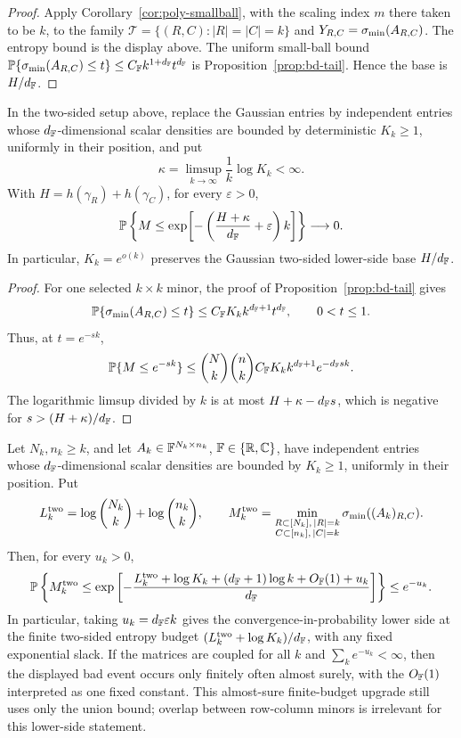 \begin{proof}
Apply Corollary~\ref{cor:poly-smallball}, with the scaling index \(m\) there
taken to be \(k\), to the family \(\mathcal T=\{(R,C):|R|=|C|=k\}\) and
\(Y_{R,C}=\sigma_{\min}(A_{R,C})\).  The entropy bound is the display above.  The uniform
small-ball bound \(\mathbb{P}\{\sigma_{\min}(A_{R,C})\le t\}\le C_{\mathbb{F}} k^{1+d_{\mathbb{F}}}t^{d_{\mathbb{F}}}\) is
Proposition~\ref{prop:bd-tail}.  Hence the base is \(H/d_{\mathbb{F}}\).
\end{proof}

\begin{theorem}\label{two:density-rate-lower}
In the two-sided setup above, replace the Gaussian entries by independent
entries whose \(d_{\mathbb{F}}\)-dimensional scalar densities are bounded by deterministic
\(K_k\ge1\), uniformly in their position, and put
\[
  \kappa=\limsup_{k\to\infty}\frac1k\log K_k<\infty .
\]
With \(H=h(\gamma_R)+h(\gamma_C)\), for every \(\varepsilon>0\),
\[
  \mathbb{P}\left\{M\le
  \exp\!\left[-\left(\frac{H+\kappa}{d_{\mathbb{F}}}+\varepsilon\right)k\right]\right\}
  \longrightarrow0.
\]
In particular, \(K_k=e^{o(k)}\) preserves the Gaussian two-sided lower-side
base \(H/d_{\mathbb{F}}\).
\end{theorem}

\begin{proof}
For one selected \(k\times k\) minor, the proof of
Proposition~\ref{prop:bd-tail} gives
\[
  \mathbb{P}\{\sigma_{\min}(A_{R,C})\le t\}\le C_{\mathbb{F}} K_k k^{d_{\mathbb{F}}+1}t^{d_{\mathbb{F}}},\qquad 0<t\le1.
\]
Thus, at \(t=e^{-sk}\),
\[
  \mathbb{P}\{M\le e^{-sk}\}
  \le \binom{N}{k}\binom{n}{k}
       C_{\mathbb{F}} K_k k^{d_{\mathbb{F}}+1}e^{-d_{\mathbb{F}} sk}.
\]
The logarithmic limsup divided by \(k\) is at most \(H+\kappa-d_{\mathbb{F}} s\), which is
negative for \(s>(H+\kappa)/d_{\mathbb{F}}\).
\end{proof}

\begin{corollary}\label{two:finite-entropy}
Let \(N_k,n_k\ge k\), and let \(A_k\in\mathbb{F}^{N_k\times n_k}\),
\(\mathbb{F}\in\{\mathbb{R},\mathbb{C}\}\), have independent entries whose \(d_{\mathbb{F}}\)-dimensional scalar
densities are bounded by \(K_k\ge1\), uniformly in their position.  Put
\[
  L_k^{\rm two}=\log\binom{N_k}{k}+\log\binom{n_k}{k},
  \qquad
  M_k^{\rm two}
  =
  \min_{\substack{R\subset[N_k],\, |R|=k\\ C\subset[n_k],\, |C|=k}}
  \sigma_{\min}((A_k)_{R,C}).
\]
Then, for every \(u_k>0\),
\[
  \mathbb{P}\left\{
  M_k^{\rm two}\le
  \exp\left[-\frac{
  L_k^{\rm two}+\log K_k+(d_{\mathbb{F}}+1)\log k+O_{\mathbb{F}}(1)+u_k
  }{d_{\mathbb{F}}}\right]
  \right\}
  \le e^{-u_k}.
\]
In particular, taking \(u_k=d_{\mathbb{F}}\varepsilon k\) gives the
convergence-in-probability lower side at the finite two-sided entropy budget
\((L_k^{\rm two}+\log K_k)/d_{\mathbb{F}}\), with any fixed exponential slack.
If the matrices are coupled for all \(k\) and \(\sum_k e^{-u_k}<\infty\), then
the displayed bad event occurs only finitely often almost surely, with the
\(O_{\mathbb{F}}(1)\) interpreted as one fixed constant.  This almost-sure finite-budget
upgrade still uses only the union bound; overlap between row-column minors is
irrelevant for this lower-side statement.
\end{corollary}

